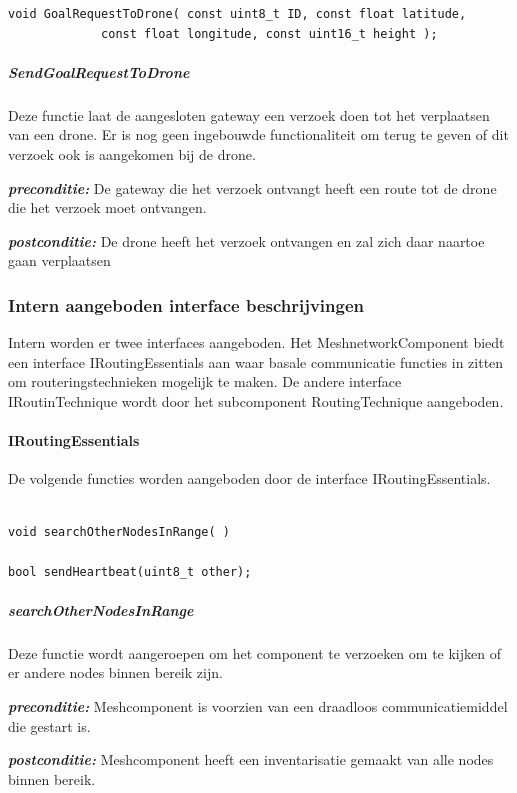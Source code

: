 \documentclass[a4paper, 11pt, oneside]{report}
\begin{document}
\begin{lstlisting}
void GoalRequestToDrone( const uint8_t ID, const float latitude,
			 const float longitude, const uint16_t height );
\end{lstlisting}

\subparagraph{SendGoalRequestToDrone}
Deze functie laat de aangesloten gateway een verzoek doen tot het verplaatsen van een drone. Er is nog geen ingebouwde functionaliteit om terug te geven of dit verzoek ook is aangekomen bij de drone. 

\textbf{\textit{preconditie:}} De gateway die het verzoek ontvangt heeft een route tot de drone die het verzoek moet ontvangen. 

\textbf{\textit{postconditie:}} De drone heeft het verzoek ontvangen en zal zich daar naartoe gaan verplaatsen

\subsubsection{Intern aangeboden interface beschrijvingen}
\label{DetailedDesign:CommunicatieComponentDiagram:interface:intern}

Intern worden er twee interfaces aangeboden. Het MeshnetworkComponent biedt een interface IRoutingEssentials aan waar basale communicatie functies in zitten om routeringstechnieken mogelijk te maken.  De andere interface IRoutinTechnique wordt door het subcomponent RoutingTechnique aangeboden.

\paragraph{IRoutingEssentials}

De volgende functies worden aangeboden door de interface IRoutingEssentials. 

\begin{lstlisting}

void searchOtherNodesInRange( )	

bool sendHeartbeat(uint8_t other);

\end{lstlisting}
\subparagraph{searchOtherNodesInRange}
Deze functie wordt aangeroepen om het component te verzoeken om te kijken of er andere nodes binnen bereik zijn.


\textbf{\textit{preconditie:}} Meshcomponent is voorzien van een draadloos communicatiemiddel die gestart is. 

\textbf{\textit{postconditie:}} Meshcomponent heeft een inventarisatie gemaakt van alle nodes binnen bereik. 
\end{document}
